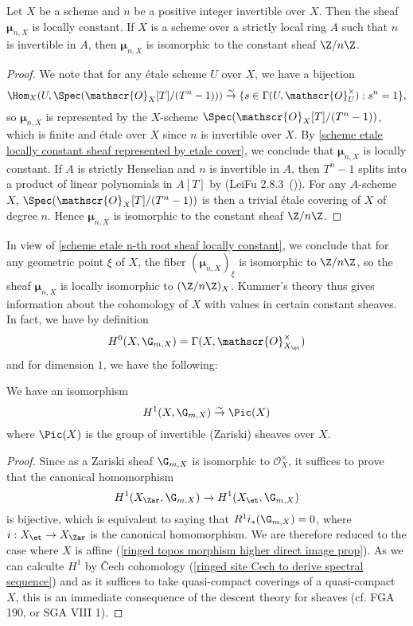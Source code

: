 \begin{proposition}\label{scheme etale n-th root sheaf locally constant}
Let $X$ be a scheme and $n$ be a positive integer invertible over $X$. Then the sheaf $\bm{\mu}_{n,X}$ is locally constant. If $X$ is a scheme over a strictly local ring $A$ such that $n$ is invertible in $A$, then $\bm{\mu}_{n,X}$ is isomorphic to the constant sheaf $\Z/n\Z$.
\end{proposition}
\begin{proof}
We note that for any \'etale scheme $U$ over $X$, we have a bijection
\[\Hom_X(U,\Spec(\mathscr{O}_X[T]/(T^n-1))) \stackrel{\sim}{\to} \{s\in\Gamma(U,\mathscr{O}_U^\times):s^n=1\},\]
so $\bm{\mu}_{n,X}$ is represented by the $X$-scheme $\Spec(\mathscr{O}_X[T]/(T^n-1))$, which is finite and \'etale over $X$ since $n$ is invertible over $X$. By \cref{scheme etale locally constant sheaf represented by etale cover}, we conclude that $\bm{\mu}_{n,X}$ is locally constant. If $A$ is strictly Henselian and $n$ is invertible in $A$, then $T^n-1$ splits into a product of linear polynomials in $A[T]$ by (LeiFu 2.8.3~()). For any $A$-scheme $X$, $\Spec(\mathscr{O}_X[T]/(T^n-1))$ is then a trivial \'etale covering of $X$ of degree $n$. Hence $\bm{\mu}_{n,X}$ is isomorphic to the constant sheaf $\Z/n\Z$.
\end{proof}
In view of \cref{scheme etale n-th root sheaf locally constant}, we conclude that for any geometric point $\xi$ of $X$, the fiber $(\bm{\mu}_{n,X})_\xi$ is isomorphic to $\Z/n\Z$, so the sheaf $\bm{\mu}_{n,X}$ is locally isomorphic to $(\Z/n\Z)_X$. Kummer's theory thus gives information about the cohomology of $X$ with values in certain constant sheaves. In fact, we have by definition
\[H^0(X,\G_{m,X})=\Gamma(X,\mathscr{O}_{X_\et}^\times)\]
and for dimension $1$, we have the following:
\begin{theorem}\label{scheme etale Hilbert theorem 90}
We have an isomorphism
\[H^1(X,\G_{m,X}) \stackrel{\sim}{\to} \Pic(X)\]
where $\Pic(X)$ is the group of invertible (Zariski) sheaves over $X$.
\end{theorem}
\begin{proof}
Since as a Zariski sheaf $\G_{m,X}$ is isomorphic to $\mathscr{O}_X^\times$, it suffices to prove that the canonical homomorphism
\[H^1(X_\Zar,\G_{m,X})\to H^1(X_\et,\G_{m,X})\]
is bijective, which is equivalent to saying that $R^1i_*(\G_{m,X})=0$, where $i:X_\et\to X_\Zar$ is the canonical homomorphism. We are therefore reduced to the case where $X$ is affine (\cref{ringed topos morphism higher direct image prop}). As we can calculte $H^1$ by \v{C}ech cohomology (\cref{ringed site Cech to derive spectral sequence}) and as it suffices to take quasi-compact coverings of a quasi-compact $X$, this is an immediate consequence of the descent theory for sheaves (cf. FGA 190, or SGA VIII 1).
\end{proof}

